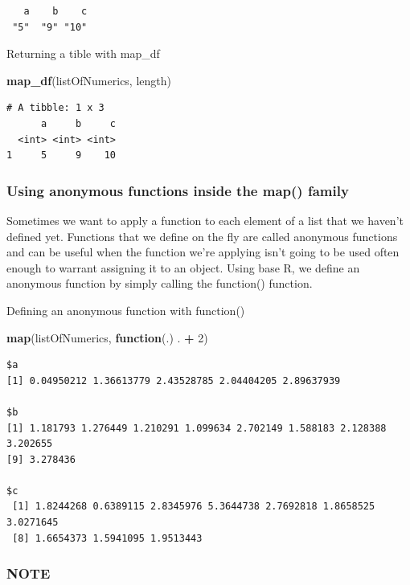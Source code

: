 \documentclass[
]{article}
\newenvironment{Shaded}{\begin{snugshade}}{\end{snugshade}}
\newcommand{\ControlFlowTok}[1]{\textcolor[rgb]{0.13,0.29,0.53}{\textbf{#1}}}
\newcommand{\DecValTok}[1]{\textcolor[rgb]{0.00,0.00,0.81}{#1}}
\newcommand{\FunctionTok}[1]{\textcolor[rgb]{0.13,0.29,0.53}{\textbf{#1}}}
\newcommand{\NormalTok}[1]{#1}
\newcommand{\SpecialCharTok}[1]{\textcolor[rgb]{0.81,0.36,0.00}{\textbf{#1}}}
\begin{document}
\begin{verbatim}
   a    b    c 
 "5"  "9" "10" 
\end{verbatim}

Returning a tible with map\_df

\begin{Shaded}
\begin{Highlighting}[]
\FunctionTok{map\_df}\NormalTok{(listOfNumerics, length)}
\end{Highlighting}
\end{Shaded}

\begin{verbatim}
# A tibble: 1 x 3
      a     b     c
  <int> <int> <int>
1     5     9    10
\end{verbatim}

\subsubsection{Using anonymous functions inside the map()
family}\label{using-anonymous-functions-inside-the-map-family}

Sometimes we want to apply a function to each element of a list that we
haven't defined yet. Functions that we define on the fly are called
anonymous functions and can be useful when the function we're applying
isn't going to be used often enough to warrant assigning it to an
object. Using base R, we define an anonymous function by simply calling
the function() function.

Defining an anonymous function with function()

\begin{Shaded}
\begin{Highlighting}[]
\FunctionTok{map}\NormalTok{(listOfNumerics, }\ControlFlowTok{function}\NormalTok{(.) . }\SpecialCharTok{+} \DecValTok{2}\NormalTok{)}
\end{Highlighting}
\end{Shaded}

\begin{verbatim}
$a
[1] 0.04950212 1.36613779 2.43528785 2.04404205 2.89637939

$b
[1] 1.181793 1.276449 1.210291 1.099634 2.702149 1.588183 2.128388 3.202655
[9] 3.278436

$c
 [1] 1.8244268 0.6389115 2.8345976 5.3644738 2.7692818 1.8658525 3.0271645
 [8] 1.6654373 1.5941095 1.9513443
\end{verbatim}

\subsubsection{NOTE}\label{note-1}
\end{document}
